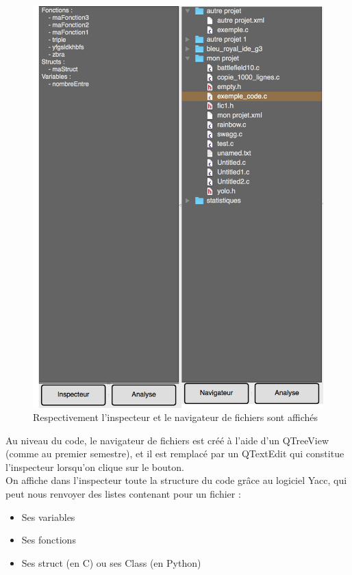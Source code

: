 \documentclass[a4paper,12pt]{article}
\begin{document}
	\begin{figure}[h!]
		\begin{center}
			\includegraphics[scale=0.5]{images/insp_nav.png}
			\caption{Respectivement l'inspecteur et le navigateur de fichiers sont affichés}
		\end{center}
	\end{figure}
	
	\newpage
	
	Au niveau du code, le navigateur de fichiers est créé à l'aide d'un QTreeView (comme au premier semestre), et il est remplacé par un QTextEdit qui constitue l'inspecteur lorsqu'on clique sur le bouton.\\
	
	On affiche dans l'inspecteur toute la structure du code grâce au logiciel Yacc, qui peut nous renvoyer des listes contenant pour un fichier :
	
	\begin{itemize}
		\item Ses variables
		\item Ses fonctions
		\item Ses struct (en C) ou ses Class (en Python)\\
	\end{itemize}
	
\end{document}
